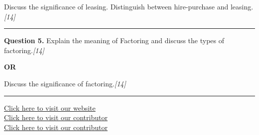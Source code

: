 \documentclass[11pt,a4paper]{article}
\newcommand{\pts}[1]{\hfill   \textit{[#1]}}
\begin{document}
Discuss the significance of leasing. Distinguish between hire-purchase and leasing.\pts{14}

\medskip\rule{\linewidth}{0.2pt}




\noindent   \textbf{Question 5.}
Explain the meaning of Factoring and discuss the types of factoring.\pts{14}

\centerline{   \textbf{OR}}

Discuss the significance of factoring.\pts{14}

\vfill
\rule{\linewidth}{0.4pt}

\begin{center}\small
\href{https://bhu-exam.vercel.app/}{Click here to visit our website}\\[4pt]
\href{https://me-aryan.vercel.app/}{Click here to visit our contributor}\\[4pt]
\href{https://quashan-me.vercel.app/}{Click here to visit our contributor}
\end{center}
\end{document}

